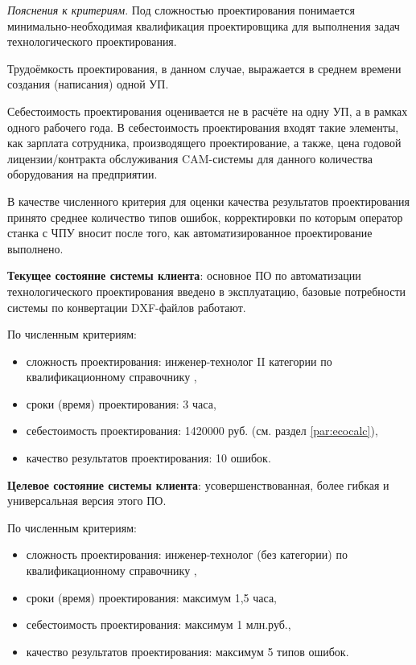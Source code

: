 \textit{Пояснения к критериям}. Под сложностью проектирования понимается минимально-необходимая квалификация проектировщика для выполнения задач технологического проектирования.

Трудоёмкость проектирования, в данном случае, выражается в среднем времени создания (написания) одной УП.

Себестоимость проектирования оценивается не в расчёте на одну УП, а в рамках одного рабочего года. В себестоимость проектирования входят такие элементы, как зарплата сотрудника, производящего проектирование, а также, цена годовой лицензии/контракта обслуживания CAM-системы для данного количества оборудования на предприятии.

В качестве численного критерия для оценки качества результатов проектирования принято среднее количество типов ошибок, корректировки по которым оператор станка с ЧПУ вносит после того, как автоматизированное проектирование выполнено.

\textbf{Текущее состояние системы клиента}: основное ПО по автоматизации технологического проектирования введено в эксплуатацию, базовые потребности системы по конвертации DXF-файлов работают.

По численным критериям:
\begin{itemize}
	\item сложность проектирования: инженер-технолог II категории по квалификационному справочнику \cite{qualification},
	\item сроки (время) проектирования: 3 часа,
	\item себестоимость проектирования: 1420000 руб. (см. раздел \ref{par:ecocalc}),
	\item качество результатов проектирования: 10 ошибок.
\end{itemize}

\textbf{Целевое состояние системы клиента}: усовершенствованная, более гибкая и универсальная версия этого ПО.

По численным критериям:
\begin{itemize}
	\item сложность проектирования: инженер-технолог (без категории) по квалификационному справочнику \cite{qualification},
	\item сроки (время) проектирования: максимум 1,5 часа,
	\item себестоимость проектирования: максимум 1 млн.руб.,
	\item качество результатов проектирования: максимум 5 типов ошибок.
\end{itemize}

